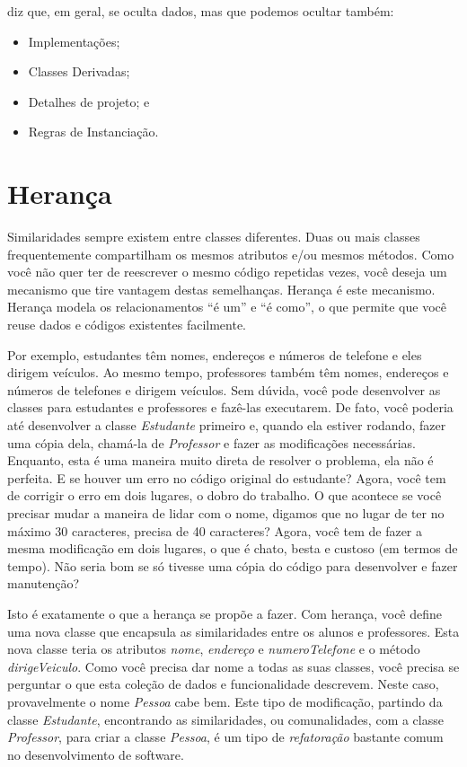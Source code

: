 \cite{DP:explained} diz que, em geral, se oculta dados, mas que podemos ocultar também:
\begin{itemize}
\item Implementações;
\item Classes Derivadas;
\item Detalhes de projeto; e
\item Regras de Instanciação.
\end{itemize}


\section{Herança}

Similaridades sempre existem entre classes diferentes. Duas ou mais classes frequentemente compartilham os mesmos atributos e/ou mesmos métodos. Como você não quer ter de reescrever o mesmo código repetidas vezes, você deseja um mecanismo que tire vantagem destas semelhanças. Herança é este mecanismo. Herança modela os relacionamentos ``é um'' e ``é como'', o que permite que você reuse dados e códigos existentes facilmente.

Por exemplo, estudantes têm nomes, endereços e números de telefone e eles dirigem veículos. Ao mesmo tempo, professores também têm nomes, endereços e números de telefones e dirigem veículos. Sem dúvida, você pode desenvolver as classes para estudantes e professores e fazê-las executarem. De fato, você poderia até desenvolver a classe \emph{Estudante} primeiro e, quando ela estiver rodando, fazer uma cópia dela, chamá-la de \emph{Professor} e fazer as modificações necessárias. Enquanto, esta é uma maneira muito direta de resolver o problema, ela não é perfeita. E se houver um erro no código original do estudante? Agora, você tem de corrigir o erro em dois lugares, o dobro do trabalho. O que acontece se você precisar mudar a maneira de lidar com o nome, digamos que no lugar de ter no máximo 30 caracteres, precisa de 40 caracteres? Agora, você tem de fazer a mesma modificação em dois lugares, o que é chato, besta e custoso (em termos de tempo). Não seria bom se só tivesse uma cópia do código para desenvolver e fazer manutenção?

Isto é exatamente o que a herança se propõe a fazer. Com herança, você define uma nova classe que encapsula as similaridades entre os alunos e professores. Esta nova classe teria os atributos \emph{nome}, \emph{endereço} e \emph{numeroTelefone} e o método \emph{dirigeVeiculo}. Como você precisa dar nome a todas as suas classes, você precisa se perguntar o que esta coleção de dados e funcionalidade descrevem. Neste caso, provavelmente o nome \emph{Pessoa} cabe bem. Este tipo de modificação, partindo da classe \emph{Estudante}, encontrando as similaridades, ou comunalidades, com a classe \emph{Professor}, para criar a classe \emph{Pessoa}, é um tipo de \emph{refatoração} bastante comum no desenvolvimento de software.

